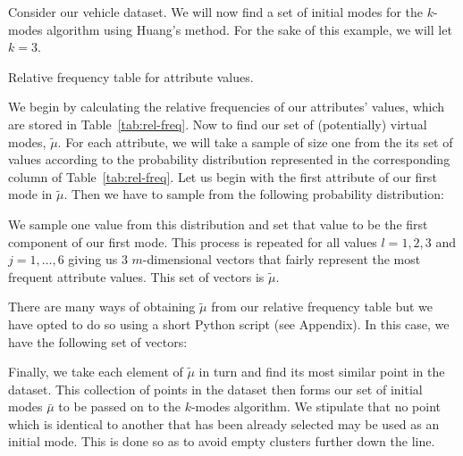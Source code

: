 \begin{example}\label{ex:huang}
    Consider our vehicle dataset. We will now find a set of initial modes for
    the \(k\)-modes algorithm using Huang's method. For the sake of this
    example, we will let \(k = 3\).
    
    \begin{table}[H]
    \centering
    \singlespacing{%
    \resizebox{.8\textwidth}{!}{%
        
    }}
    \caption{Relative frequency table for attribute values.}\label{tab:rel-freq}
    \end{table}

    We begin by calculating the relative frequencies of our attributes' values,
    which are stored in Table~\ref{tab:rel-freq}. Now to find our set of
    (potentially) virtual modes, \(\tilde{\mu}\). For each attribute, we will
    take a sample of size one from the its set of values according to the
    probability distribution represented in the corresponding column of
    Table~\ref{tab:rel-freq}. Let us begin with the first attribute of our first
    mode in \(\tilde{\mu}\). Then we have to sample from the following
    probability distribution:
    
    \begin{table}[H]
    \centering
    \end{table}
    
    We sample one value from this distribution and set that value to be the
    first component of our first mode. This process is repeated for all values
    \(l = 1, 2, 3\) and \(j = 1, \ldots, 6\) giving us \(3\) \(m\)-dimensional
    vectors that fairly represent the most frequent attribute values. This set
    of vectors is \(\tilde{\mu}\).

    There are many ways of obtaining \(\tilde{\mu}\) from our relative frequency
    table but we have opted to do so using a short Python script (see Appendix).
    In this case, we have the following set of vectors:

    

    Finally, we take each element of \(\tilde{\mu}\) in turn and find its most
    similar point in the dataset. This collection of points in the dataset then
    forms our set of initial modes \(\bar{\mu}\) to be passed on to the 
    \(k\)-modes algorithm. We stipulate that no point which is identical to
    another that has been already selected may be used as an initial mode. This
    is done so as to avoid empty clusters further down the line.


\end{example}
